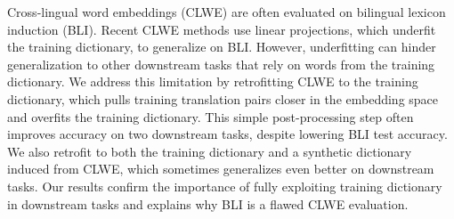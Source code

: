 Cross-lingual word embeddings (CLWE) are often evaluated on bilingual lexicon induction (BLI). Recent CLWE methods use linear projections, which underfit the training dictionary, to generalize on BLI. However, underfitting can hinder generalization to other downstream tasks that rely on words from the training dictionary. We address this limitation by retrofitting CLWE to the training dictionary, which pulls training translation pairs closer in the embedding space and overfits the training dictionary. This simple post-processing step often improves accuracy on two downstream tasks, despite lowering BLI test accuracy. We also retrofit to both the training dictionary and a synthetic dictionary induced from CLWE, which sometimes generalizes even better on downstream tasks. Our results confirm the importance of fully exploiting training dictionary in downstream tasks and explains why BLI is a flawed CLWE evaluation.
